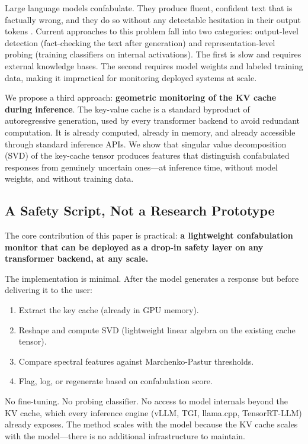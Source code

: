 Large language models confabulate. They produce fluent, confident text that
is factually wrong, and they do so without any detectable hesitation in
their output tokens \citep{ji2023survey}. Current approaches to this problem
fall into two categories: output-level detection (fact-checking the text
after generation) and representation-level probing (training classifiers on
internal activations). The first is slow and requires external knowledge
bases. The second requires model weights and labeled training data, making
it impractical for monitoring deployed systems at scale.

We propose a third approach: \textbf{geometric monitoring of the KV cache
during inference}. The key-value cache is a standard byproduct of
autoregressive generation, used by every transformer backend to avoid
redundant computation. It is already computed, already in memory, and
already accessible through standard inference APIs. We show that singular
value decomposition (SVD) of the key-cache tensor produces features that
distinguish confabulated responses from genuinely uncertain
ones---at inference time, without model weights, and without training
data.

\subsection{A Safety Script, Not a Research Prototype}

The core contribution of this paper is practical: \textbf{a lightweight
confabulation monitor that can be deployed as a drop-in safety layer on
any transformer backend, at any scale.}

The implementation is minimal. After the model generates a response but
before delivering it to the user:

\begin{enumerate}[nosep]
  \item Extract the key cache (already in GPU memory).
  \item Reshape and compute SVD (lightweight linear algebra on the
    existing cache tensor).
  \item Compare spectral features against Marchenko-Pastur thresholds.
  \item Flag, log, or regenerate based on confabulation score.
\end{enumerate}

No fine-tuning. No probing classifier. No access to model internals
beyond the KV cache, which every inference engine (vLLM, TGI,
llama.cpp, TensorRT-LLM) already exposes. The method scales with the
model because the KV cache scales with the model---there is no
additional infrastructure to maintain.

